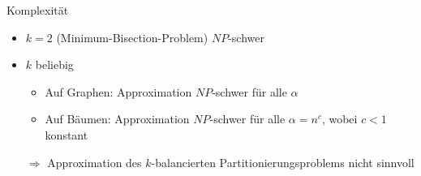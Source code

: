 \begin{frame}{Komplexität}
    \begin{itemize}[<+(1)->]
        \item $k=2$ (Minimum-Bisection-Problem) $NP$\hyp schwer
        \item $k$ beliebig
            \begin{itemize}[<+(1)->]
                \item Auf Graphen: Approximation $NP$\hyp schwer für alle $\alpha$ 
                \item Auf Bäumen: Approximation $NP$\hyp schwer für alle $\alpha = n^c$, wobei $c < 1$ konstant 
            \end{itemize}
        \item[$\Rightarrow$] Approximation des $k$\hyp balancierten Partitionierungsproblems nicht sinnvoll
    \end{itemize}
\end{frame}

